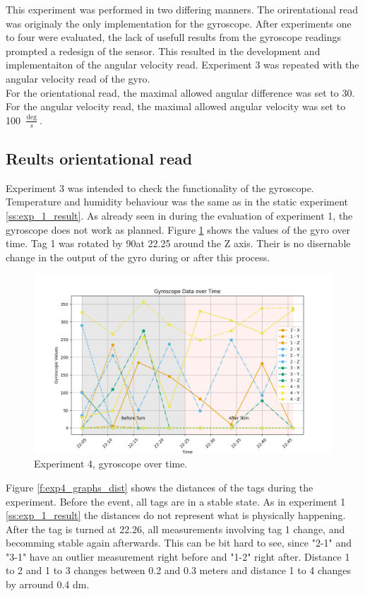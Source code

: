 This experiment was performed in two differing manners.
The orirentational read was originaly the only implementation for the gyroscope.
After experiments one to four were evaluated, the lack of usefull results from the gyroscope readings prompted a redesign of the sensor.
This resulted in the development and implementaiton of the angular velocity read.
Experiment 3 was repeated with the angular velocity read of the gyro.\\
For the orientational read, the maximal allowed angular difference was set to 30\degree.
For the angular velocity read, the maximal allowed angular velocity was set to 100 $\frac{\deg}{s}$.


\subsection{Reults orientational read}
\label{ss:exp_3_result}
Experiment 3 was intended to check the functionality of the gyroscope.
Temperature and humidity behaviour was the same as in the static experiment \ref{ss:exp_1_result}.
As already seen in during the evaluation of experiment 1, the gyroscope does not work as planned.
Figure \ref{f:exp4_graphs_gyro} shows the values of the gyro over time.
Tag 1 was rotated by 90\degree  at 22.25 around the Z axis.
Their is no disernable change in the output of the gyro during or after this process.

\begin{figure}[ht!]
	\includegraphics[width=\linewidth]{graphics/exp/exp4_gyro_data_plot_1.png}
	\caption{Experiment 4, gyroscope over time.}
	\label{f:exp4_graphs_gyro}
\end{figure}
Figure \ref{f:exp4_graphs_dist} shows the distances of the tags during the experiment.
Before the event, all tags are in a stable state.
As in experiment 1 \ref{ss:exp_1_result} the distances do not represent what is physically happening.
After the tag is turned at 22.26, all measurements involving tag 1 change, and becomming stable again afterwards.
This can be bit hard to see, since "2-1" and "3-1" have an outlier measurement right before and "1-2" right after.
Distance 1 to 2 and 1 to 3 changes between 0.2 and 0.3 meters and distance 1 to 4 changes by arround 0.4 dm.

